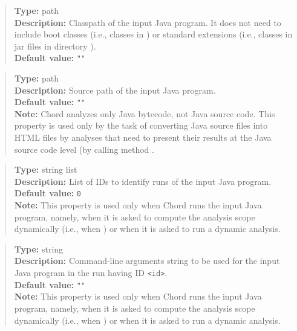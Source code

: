 \begin{quote}
{\bf Type:} path \\
{\bf Description:} Classpath of the input Java program.  It does not need to include
boot classes (i.e., classes in ) or
standard extensions (i.e., classes in jar files in directory ). \\
{\bf Default value:} {\tt ""}
\end{quote}

\begin{quote}
{\bf Type:} path \\
{\bf Description:} Source path of the input Java program. \\
{\bf Default value:} {\tt ""} \\
{\bf Note:} Chord analyzes only Java bytecode, not Java source code.  This property is used only by the task of converting Java source files into HTML files by analyses that need to present their results at the Java source code level (by calling method .
\end{quote}

\begin{quote}
{\bf Type:} string list \\
{\bf Description:} List of IDs to identify runs of the input Java program. \\
{\bf Default value:} {\tt 0} \\
{\bf Note:} This property is used only when Chord runs the input Java program, namely, when it is asked to compute the analysis scope dynamically (i.e., when ) or when it is asked to run a dynamic analysis. 
\end{quote}

\begin{quote}
{\bf Type:} string \\
{\bf Description:} Command-line arguments string to be used for the input Java program in the run having ID {\tt <id>}. \\
{\bf Default value:} {\tt ""} \\
{\bf Note:} This property is used only when Chord runs the input Java program, namely, when it is asked to compute the analysis scope dynamically (i.e., when ) or when it is asked to run a dynamic analysis.
\end{quote}

